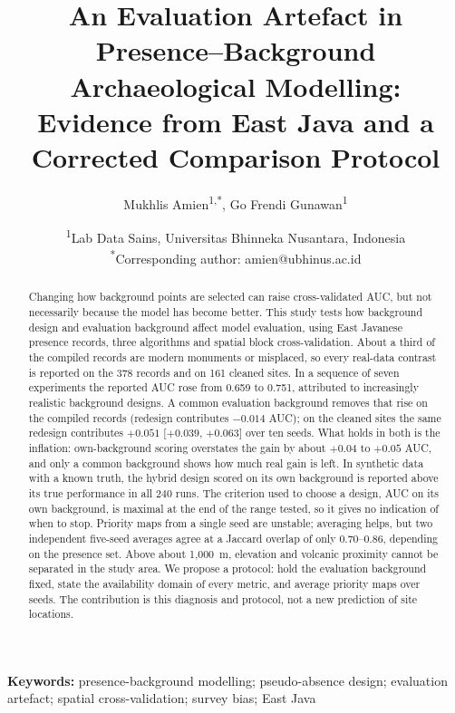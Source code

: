 \documentclass[12pt]{article}
\title{An Evaluation Artefact in Presence--Background Archaeological Modelling:\\
Evidence from East Java and a Corrected Comparison Protocol}
\author{Mukhlis Amien\textsuperscript{1,*}, Go Frendi Gunawan\textsuperscript{1}}
\date{%
\textsuperscript{1}Lab Data Sains, Universitas Bhinneka Nusantara, Indonesia\\
\textsuperscript{*}Corresponding author: amien@ubhinus.ac.id%
}
\begin{document}
\maketitle

\begin{abstract}
\noindent
Changing how background points are selected can raise cross-validated AUC, but not necessarily because the model has become better.
This study tests how background design and evaluation background affect model evaluation, using East Javanese presence records, three algorithms and spatial block cross-validation.
About a third of the compiled records are modern monuments or misplaced, so every real-data contrast is reported on the 378 records and on 161 cleaned sites.
In a sequence of seven experiments the reported AUC rose from 0.659 to 0.751, attributed to increasingly realistic background designs.
A common evaluation background removes that rise on the compiled records (redesign contributes $-0.014$ AUC); on the cleaned sites the same redesign contributes $+0.051$ [$+0.039$, $+0.063$] over ten seeds.
What holds in both is the inflation: own-background scoring overstates the gain by about $+0.04$ to $+0.05$ AUC, and only a common background shows how much real gain is left.
In synthetic data with a known truth, the hybrid design scored on its own background is reported above its true performance in all 240 runs.
The criterion used to choose a design, AUC on its own background, is maximal at the end of the range tested, so it gives no indication of when to stop.
Priority maps from a single seed are unstable; averaging helps, but two independent five-seed averages agree at a Jaccard overlap of only 0.70--0.86, depending on the presence set.
Above about 1,000~m, elevation and volcanic proximity cannot be separated in the study area.
We propose a protocol: hold the evaluation background fixed, state the availability domain of every metric, and average priority maps over seeds.
The contribution is this diagnosis and protocol, not a new prediction of site locations.
\end{abstract}

\noindent\textbf{Keywords:} presence-background modelling; pseudo-absence design; evaluation artefact; spatial cross-validation; survey bias; East Java
\end{document}
